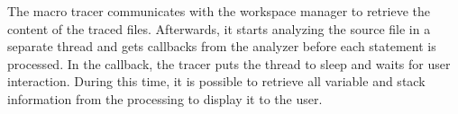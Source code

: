 The macro tracer communicates with the workspace manager to retrieve the content of the traced files. Afterwards, it starts analyzing the source file in a separate thread and gets callbacks from the analyzer before each statement is processed. In the callback, the tracer puts the thread to sleep and waits for user interaction. During this time, it is possible to retrieve all variable and stack information from the processing to display it to the user.
